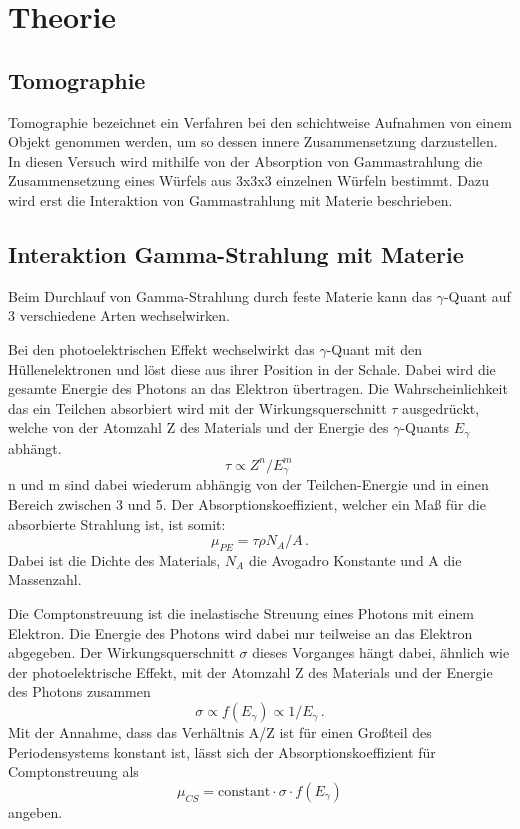 \section{Theorie}
\label{sec:Theorie}

\subsection{Tomographie}

Tomographie bezeichnet ein Verfahren bei den schichtweise Aufnahmen von einem Objekt genommen werden, um so dessen innere Zusammensetzung darzustellen.
In diesen Versuch wird mithilfe von der Absorption von Gammastrahlung die Zusammensetzung eines Würfels aus 3x3x3 einzelnen Würfeln bestimmt.
Dazu wird erst die Interaktion von Gammastrahlung mit Materie beschrieben.

\subsection{Interaktion Gamma-Strahlung mit Materie}

Beim Durchlauf von Gamma-Strahlung durch feste Materie kann das $\gamma$-Quant auf 3 verschiedene Arten wechselwirken.

Bei den photoelektrischen Effekt wechselwirkt das $\gamma$-Quant mit den Hüllenelektronen und löst diese aus ihrer Position in der Schale. Dabei wird die gesamte Energie des Photons an das Elektron übertragen.
Die Wahrscheinlichkeit das ein Teilchen absorbiert wird mit der  Wirkungsquerschnitt $\tau$ ausgedrückt, welche von der Atomzahl Z des Materials und der Energie des $\gamma$-Quants $E_\gamma$ abhängt. 
\begin{equation*}
    \tau \propto Z^n / E_\gamma^m \,
\end{equation*}
n und m sind dabei wiederum abhängig von der Teilchen-Energie und in einen Bereich zwischen 3 und 5.
Der Absorptionskoeffizient, welcher ein Maß für die absorbierte Strahlung ist, ist somit:
\begin{equation}
    \mu_{PE} = \tau  \rho  N_A/A \,.
\end{equation}
Dabei ist \rho die Dichte des Materials, $N_A$ die Avogadro Konstante und A die Massenzahl.

Die Comptonstreuung ist die inelastische Streuung eines Photons mit einem Elektron. Die Energie des Photons wird dabei nur teilweise an das Elektron abgegeben.
Der Wirkungsquerschnitt $\sigma$ dieses Vorganges hängt dabei, ähnlich wie der photoelektrische Effekt,  mit der Atomzahl Z des Materials und der Energie des Photons zusammen 
\begin{equation*}
    \sigma \propto f(E_\gamma) \propto 1/E_\gamma\,.
\end{equation*}
Mit der Annahme, dass das Verhältnis A/Z ist für einen Großteil des Periodensystems konstant ist, lässt sich der Absorptionskoeffizient für Comptonstreuung als 
\begin{equation}
    \mu_{CS} = \text{constant} \cdot \sigma \cdot f(E_\gamma)
\end{equation}
angeben. 

